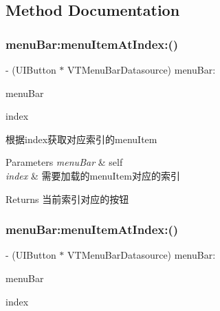 \subsection{Method Documentation}
\mbox{\label{protocol_v_t_menu_bar_datasource_01-p_a2ea6a47a6c08cfc20a33a808f70f0436}} 
\subsubsection{\texorpdfstring{menu\+Bar\+:menu\+Item\+At\+Index\+:()}{menuBar:menuItemAtIndex:()}\hspace{0.1cm}{\footnotesize\ttfamily [1/3]}}
{\footnotesize\ttfamily -\/ (U\+I\+Button $\ast$ V\+T\+Menu\+Bar\+Datasource) menu\+Bar\+: \begin{DoxyParamCaption}\item[{(\mbox{\hyperlink{interface_v_t_menu_bar}{V\+T\+Menu\+Bar}} $\ast$)}]{menu\+Bar }\item[{menuItemAtIndex:(N\+S\+U\+Integer)}]{index }\end{DoxyParamCaption}}

根据index获取对应索引的menu\+Item


\begin{DoxyParams}{Parameters}
{\em menu\+Bar} & self \\
\hline
{\em index} & 需要加载的menu\+Item对应的索引\\
\hline
\end{DoxyParams}
\begin{DoxyReturn}{Returns}
当前索引对应的按钮 
\end{DoxyReturn}
\mbox{\label{protocol_v_t_menu_bar_datasource_01-p_a2ea6a47a6c08cfc20a33a808f70f0436}} 
\subsubsection{\texorpdfstring{menu\+Bar\+:menu\+Item\+At\+Index\+:()}{menuBar:menuItemAtIndex:()}\hspace{0.1cm}{\footnotesize\ttfamily [2/3]}}
{\footnotesize\ttfamily -\/ (U\+I\+Button $\ast$ V\+T\+Menu\+Bar\+Datasource) menu\+Bar\+: \begin{DoxyParamCaption}\item[{(\mbox{\hyperlink{interface_v_t_menu_bar}{V\+T\+Menu\+Bar}} $\ast$)}]{menu\+Bar }\item[{menuItemAtIndex:(N\+S\+U\+Integer)}]{index }\end{DoxyParamCaption}}

